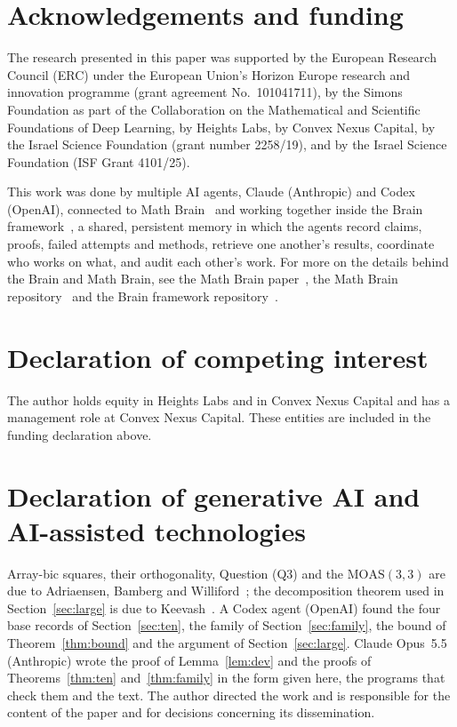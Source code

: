 \documentclass[11pt]{amsart}
\theoremstyle{definition}\newtheorem{definition}[theorem]{Definition}
\theoremstyle{remark}\newtheorem{remark}[theorem]{Remark}
\newcommand{\MOAS}{\mathrm{MOAS}}
\begin{document}
\section*{Acknowledgements and funding}
The research presented in this paper was supported by the European Research Council (ERC) under the European Union's
Horizon Europe research and innovation programme (grant agreement No.~101041711), by the Simons Foundation as part of
the Collaboration on the Mathematical and Scientific Foundations of Deep Learning, by Heights Labs, by Convex Nexus
Capital, by the Israel Science Foundation (grant number 2258/19), and by the Israel Science Foundation (ISF Grant
4101/25).

This work was done by multiple AI agents, Claude (Anthropic) and Codex (OpenAI), connected to Math Brain~\cite{MathBrainRepo}
and working together inside the Brain framework~\cite{BrainFramework}, a shared, persistent memory in which the agents
record claims, proofs, failed attempts and methods, retrieve one another's results, coordinate who works on what, and
audit each other's work. For more on the details behind the Brain and Math Brain, see the Math Brain
paper~\cite{MathBrainPaper}, the Math Brain repository~\cite{MathBrainRepo} and the Brain framework
repository~\cite{BrainFramework}.

\section*{Declaration of competing interest}
The author holds equity in Heights Labs and in Convex Nexus Capital and has a management role at Convex Nexus Capital.
These entities are included in the funding declaration above.

\section*{Declaration of generative AI and AI-assisted technologies}
Array-bic squares, their orthogonality, Question (Q3) and the $\MOAS(3,3)$ are due to Adriaensen, Bamberg and
Williford~\cite{ABW}; the decomposition theorem used in Section~\ref{sec:large} is due to Keevash~\cite{KeevashCD,KeevashII}.
A Codex agent (OpenAI) found the four base records of Section~\ref{sec:ten}, the family of Section~\ref{sec:family}, the
bound of Theorem~\ref{thm:bound} and the argument of Section~\ref{sec:large}. Claude Opus~5.5 (Anthropic) wrote the
proof of Lemma~\ref{lem:dev} and the proofs of Theorems~\ref{thm:ten} and~\ref{thm:family} in the form given here, the
programs that check them and the text. The author directed the work and is responsible for the content of the paper
and for decisions concerning its dissemination.
\end{document}
